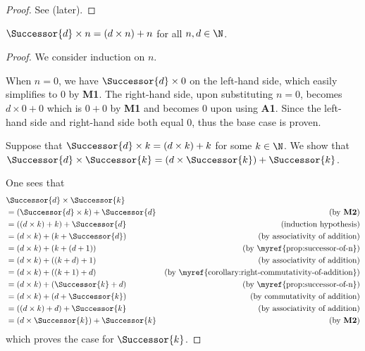 \begin{proof}
    See  (later).
\end{proof}

\begin{lemma}\label{lemma:product-of-successor-and-n}
    $\Successor{d} \times n = (d \times n) + n$ for all $n, d \in \N$.
\end{lemma}
\begin{proof}
    We consider induction on $n$.

    When $n = 0$, we have $\Successor{d} \times 0$ on the left-hand side, which easily simplifies to 0 by \textbf{M1}. The right-hand side, upon substituting $n = 0$, becomes $d \times 0 + 0$ which is $0 + 0$ by \textbf{M1} and becomes 0 upon using \textbf{A1}. Since the left-hand side and right-hand side both equal 0, thus the base case is proven.

    Suppose that $\Successor{d} \times k = (d \times k) + k$ for some $k \in \N$. We show that $\Successor{d} \times \Successor{k} = \left(d \times \Successor{k}\right) + \Successor{k}$.

    One sees that
    \begin{align*}
        &\Successor{d} \times \Successor{k}\\
        &= \left(\Successor{d} \times k\right) + \Successor{d} & (\text{by \textbf{M2}})\\
        &= \left((d \times k) + k\right) + \Successor{d} & (\text{induction hypothesis})\\
        &= (d \times k) + \left(k + \Successor{d}\right) & (\text{by associativity of addition})\\
        &= (d \times k) + \left(k + (d + 1)\right) & (\text{by \myref{prop:successor-of-n}})\\
        &= (d \times k) + \left((k + d) + 1\right) & (\text{by associativity of addition})\\
        &= (d \times k) + \left((k + 1) + d\right) & (\text{by \myref{corollary:right-commutativity-of-addition}})\\
        &= (d \times k) + \left(\Successor{k} + d\right) & (\text{by \myref{prop:successor-of-n}})\\
        &= (d \times k) + \left(d + \Successor{k}\right) & (\text{by commutativity of addition})\\
        &= \left((d \times k) + d\right) + \Successor{k} & (\text{by associativity of addition})\\
        &= \left(d \times \Successor{k}\right) + \Successor{k} & (\text{by \textbf{M2}})
    \end{align*}
    which proves the case for $\Successor{k}$.
\end{proof}

